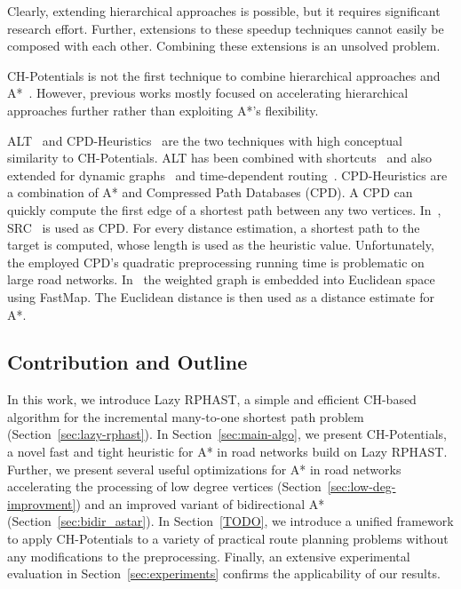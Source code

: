 \documentclass[manuscript,review]{acmart}
\begin{document}
Clearly, extending hierarchical approaches is possible, but it requires significant research effort.
Further, extensions to these speedup techniques cannot easily be composed with each other.
Combining these extensions is an unsolved problem.

CH-Potentials is not the first technique to combine hierarchical approaches and A*~\cite{bdsssw-chgds-10,gkw-blwr-07,bdgwz-sfpcs-19}.
However, previous works mostly focused on accelerating hierarchical approaches further rather than exploiting A*'s flexibility.

ALT~\cite{gh-cspas-05,gw-cppsp-05} and CPD-Heuristics~\cite{DBLP:conf/ijcai/BonoGHS19} are the two techniques with high conceptual similarity to CH-Potentials.
ALT has been combined with shortcuts~\cite{bdsssw-chgds-10} and also extended for dynamic graphs~\cite{dw-lbrdg-07} and time-dependent routing~\cite{ndls-bastd-12,dn-crdtd-12}.
%
CPD-Heuristics are a combination of A* and Compressed Path Databases (CPD).
A CPD can quickly compute the first edge of a shortest path between any two vertices.
In~\cite{DBLP:conf/ijcai/BonoGHS19}, SRC~\cite{DBLP:conf/socs/StrasserHB14} is used as CPD.
For every distance estimation, a shortest path to the target is computed, whose length is used as the heuristic value.
Unfortunately, the employed CPD's quadratic preprocessing running time is problematic on large road networks.
%
%
In~\cite{DBLP:conf/ijcai/0002UJAKK18} the weighted graph is embedded into Euclidean space using FastMap. %
The Euclidean distance is then used as a distance estimate for A*.

\subsection{Contribution and Outline}

In this work, we introduce Lazy RPHAST, a simple and efficient CH-based algorithm for the incremental many-to-one shortest path problem (Section~\ref{sec:lazy-rphast}).
In Section~\ref{sec:main-algo}, we present CH-Potentials, a novel fast and tight heuristic for A* in road networks build on Lazy RPHAST.
Further, we present several useful optimizations for A* in road networks accelerating the processing of low degree vertices (Section~\ref{sec:low-deg-improvment}) and an improved variant of bidirectional A* (Section~\ref{sec:bidir_astar}).
In Section~\ref{TODO}, we introduce a unified framework to apply CH-Potentials to a variety of practical route planning problems without any modifications to the preprocessing.
Finally, an extensive experimental evaluation in Section~\ref{sec:experiments} confirms the applicability of our results.
\end{document}
